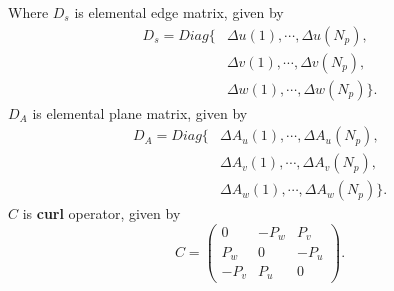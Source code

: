 Where $D_{s}$ is elemental edge matrix, given by
\begin{align*}
D_{s}=
Diag\{&\Delta u(1),\cdots,\Delta u(N_{p}),\nonumber\\
			&\Delta v(1),\cdots,\Delta v(N_{p}),\nonumber\\
			&\Delta w(1),\cdots,\Delta w(N_{p})
\} \text{.}
\end{align*}
$D_{A}$ is elemental plane matrix, given by
\begin{align*}
D_{A}=
Diag\{&\Delta A_{u}(1),\cdots,\Delta A_{u}(N_{p}),\nonumber\\
			&\Delta A_{v}(1),\cdots,\Delta A_{v}(N_{p}),\nonumber\\
			&\Delta A_{w}(1),\cdots,\Delta A_{w}(N_{p})
\} \text{.}
\end{align*}
$C$ is \textbf{curl} operator, given by
\begin{equation*}
C=
	\begin{pmatrix}
	0&-P_{w}&P_{v}\\
	P_{w}&0&-P_{u}\\
	-P_{v}&P_{u}&0
	\end{pmatrix} \text{.}
\end{equation*}
